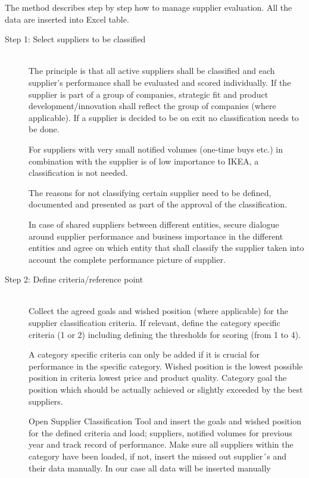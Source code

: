 \documentclass[oneside,12pt]{article}%
\begin{document}
The method describes step by step how to manage supplier evaluation. All the data are inserted into Excel table.


\begin{description}
  \item[Step 1: Select suppliers to be classified] \hfill \\
  The principle is that all active suppliers shall be classified and each supplier’s performance shall be evaluated and scored individually. If the supplier is part of a group of companies, strategic fit and product development/innovation shall reflect the group of companies (where applicable). If a supplier is decided to be on exit no classification needs to be done. \par
  For suppliers with very small notified volumes (one-time buys etc.) in combination with the supplier is of low importance to IKEA, a classification is not needed. \par
  The reasons for not classifying certain supplier need to be defined, documented and presented as part of the approval of the classification. \par
  In case of shared suppliers between different entities, secure dialogue around supplier performance and business importance in the different entities and agree on which entity that shall classify the supplier taken into account the complete performance picture of supplier.


  \item[Step 2: Define criteria/reference point] \hfill \\
  Collect the agreed goals and wished position (where applicable) for the supplier classification criteria. If relevant, define the category specific criteria (1 or 2) including defining the thresholds for scoring (from 1 to 4).\par
  A category specific criteria can only be added if it is crucial for performance in the specific category. \apr
  Wished position is the lowest possible position in criteria lowest price and product quality. Category goal the position which should be actually achieved or slightly exceeded by the best suppliers.\par
  Open Supplier Classification Tool and insert the goals and wished position for the defined criteria and load; suppliers, notified volumes for previous year and track record of performance. Make sure all suppliers within the category have been loaded, if not, insert the missed out supplier´s and their data manually. In our case all data will be inserted manually


\end{description}
\end{document}
